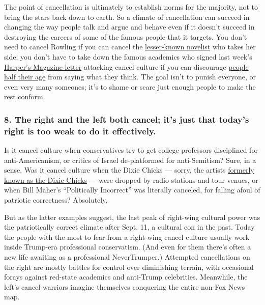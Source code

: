 The point of cancellation is ultimately to establish norms for the
majority, not to bring the stars back down to earth. So a climate of
cancellation can succeed in changing the way people talk and argue and
behave even if it doesn't succeed in destroying the careers of some of
the famous people that it targets. You don't need to cancel Rowling if
you can cancel the
\href{https://www.insider.com/gillian-philip-childrens-author-sacked-tweeting-support-jk-rowling-2020-7}{lesser-known
novelist} who takes her side; you don't have to take down the famous
academics who signed last week's
\href{https://harpers.org/a-letter-on-justice-and-open-debate/}{Harper's
Magazine letter} attacking cancel culture if you can discourage
\href{https://twitter.com/SwipeWright/status/1281793002986336256}{people
half their age} from saying what they think. The goal isn't to punish
everyone, or even very many someones; it's to shame or scare just enough
people to make the rest conform.

\hypertarget{8-the-right-and-the-left-both-cancel-its-just-that-todays-right-is-too-weak-to-do-it-effectively}{%
\subsubsection{8. The right and the left both cancel; it's just that
today's right is too weak to do it
effectively.}\label{8-the-right-and-the-left-both-cancel-its-just-that-todays-right-is-too-weak-to-do-it-effectively}}

Is it cancel culture when conservatives try to get college professors
disciplined for anti-Americanism, or critics of Israel de-platformed for
anti-Semitism? Sure, in a sense. Was it cancel culture when the Dixie
Chicks --- sorry, the artists
\href{https://www.nytimes3xbfgragh.onion/2020/06/25/arts/music/dixie-chicks-change-name.html}{formerly
known as the Dixie Chicks} --- were dropped by radio stations and tour
venues, or when Bill Maher's ``Politically Incorrect'' was literally
canceled, for falling afoul of patriotic correctness? Absolutely.

But as the latter examples suggest, the last peak of right-wing cultural
power was the patriotically correct climate after Sept. 11, a cultural
eon in the past. Today the people with the most to fear from a
right-wing cancel culture usually work inside Trump-era professional
conservatism. (And even for them there's often a new life awaiting as a
professional NeverTrumper.) Attempted cancellations on the right are
mostly battles for control over diminishing terrain, with occasional
forays against red-state academics and anti-Trump celebrities.
Meanwhile, the left's cancel warriors imagine themselves conquering the
entire non-Fox News map.

